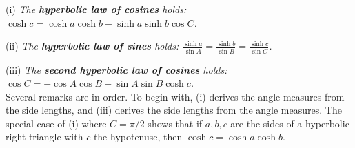 \documentclass[leqno]{book}
\begin{document}
(i) \emph{The \textbf{hyperbolic law of cosines} holds: $\cosh c=\cosh a\cosh b-\sinh a\sinh b\cos C$.}

(ii) \emph{The \textbf{hyperbolic law of sines} holds: $\frac{\sinh a}{\sin A}=\frac{\sinh b}{\sin B}=\frac{\sinh c}{\sin C}$.}

(iii) \emph{The \textbf{second hyperbolic law of cosines} holds: $\cos C=-\cos A\cos B+\sin A\sin B\cosh c$.}\\

\noindent Several remarks are in order.  To begin with, (i) derives the angle measures from the side lengths, and (iii) derives the side lengths from the angle measures.  The special case of (i) where $C=\pi/2$ shows that if $a,b,c$ are the sides of a hyperbolic right triangle with $c$ the hypotenuse, then $\cosh c=\cosh a\cosh b$.
\end{document}
